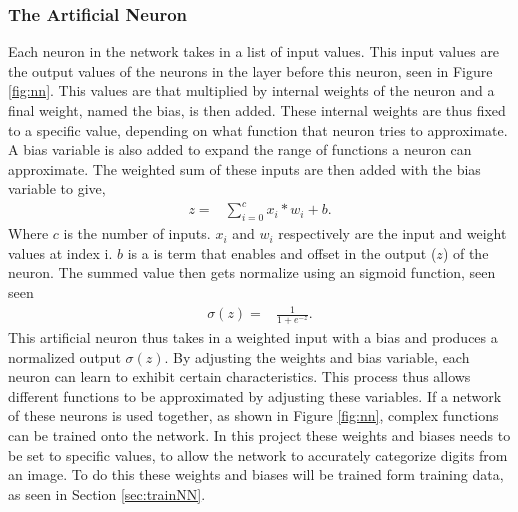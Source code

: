 \subsubsection{The Artificial Neuron}
Each neuron in the network takes in a list of input values. This input values are the output values of the neurons in the layer before this neuron, seen in Figure \ref{fig:nn}. This values are that multiplied by internal weights of the neuron and a final weight, named the bias, is then added. These internal weights are thus fixed to a specific value, depending on what function that neuron tries to approximate. A bias variable is also added to expand the range of functions a neuron can approximate. The weighted sum of these inputs are then added with the bias variable to give,
\begin{align}
  z =  &\displaystyle{\sum_{i=0}^{c} x_{i}*w_{i} + b}.
\label{eqn:nnOut}
\end{align}
Where $c$ is the number of inputs. $x_{i}$ and $w_{i}$ respectively are the input and weight values at index i. $b$ is a is term that enables and offset in the output ($z$) of the neuron.
The summed value then gets normalize using an sigmoid function, seen seen
\begin{align}
  \sigma(z) =  &\displaystyle{\frac{1}{1 + e^{-z}}}.
\label{eqn:sigmoid}
\end{align}
This artificial neuron thus takes in a weighted input with a bias and produces a normalized output $\sigma(z)$. By adjusting the weights and bias variable, each neuron can learn to exhibit certain characteristics. This process thus allows different functions to be approximated by adjusting these variables. If a network of these neurons is used together, as shown in Figure \ref{fig:nn}, complex functions can be trained onto the network. In this project these weights and biases needs to be set to specific values, to allow the network to accurately categorize digits from an image. To do this these weights and biases will be trained form training data, as seen in Section \ref{sec:trainNN}.


